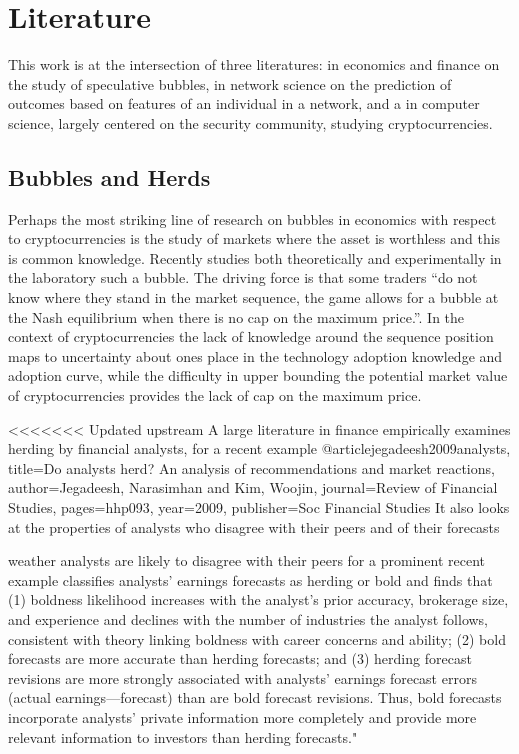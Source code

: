 \section{Literature}

This work is at the intersection of three literatures: in economics and finance on the study of speculative bubbles, in network science on the prediction of outcomes based on features of an individual in a network, and a in computer science, largely centered on the security community, studying cryptocurrencies.


\subsection{Bubbles and Herds}

Perhaps the most striking line of research on bubbles in economics with respect to cryptocurrencies is the study of markets where the asset is worthless and this is common knowledge. 
Recently \cite{moinas2013bubble} studies both theoretically and experimentally in the laboratory such a bubble. 
The driving force is that some traders ``do not know where they stand in the market sequence, the game allows for
a bubble at the Nash equilibrium when there is no cap on the maximum price.''.
In the context of cryptocurrencies the lack of knowledge around the sequence position maps to uncertainty about ones place in the technology adoption knowledge and adoption curve, while the difficulty in upper bounding the potential market value of cryptocurrencies provides the lack of cap on the maximum price. 


<<<<<<< Updated upstream
A large literature in finance empirically examines herding by financial analysts, for a recent example
@article{jegadeesh2009analysts,
  title={Do analysts herd? An analysis of recommendations and market reactions},
  author={Jegadeesh, Narasimhan and Kim, Woojin},
  journal={Review of Financial Studies},
  pages={hhp093},
  year={2009},
  publisher={Soc Financial Studies}
}
It also looks at the properties of analysts who disagree with their peers and of their forecasts

 \cite{clement2005financial} 
weather analysts are likely to disagree with their peers for a prominent recent example classifies analysts' earnings forecasts as herding or bold and finds that (1) boldness likelihood increases with the analyst's prior accuracy, brokerage size, and experience and declines with the number of industries the analyst follows, consistent with theory linking boldness with career concerns and ability; (2) bold forecasts are more accurate than herding forecasts; and (3) herding forecast revisions are more strongly associated with analysts' earnings forecast errors (actual earnings—forecast) than are bold forecast revisions. Thus, bold forecasts incorporate analysts' private information more completely and provide more relevant information to investors than herding forecasts."


